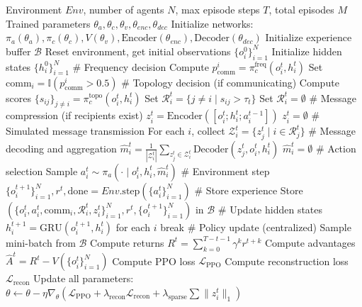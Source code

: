 \documentclass[10pt, twocolumn]{IEEEtran}
\begin{document}
\begin{algorithm}[h]
\caption{Training Algorithm for AdaptiveComm Framework}
\begin{algorithmic}[1]
\REQUIRE Environment $Env$, number of agents $N$, max episode steps $T$, total episodes $M$
\ENSURE Trained parameters $\theta_a, \theta_c, \theta_v, \theta_{enc}, \theta_{dec}$
\STATE Initialize networks: $\pi_a(\theta_a), \pi_c(\theta_c), V(\theta_v), \text{Encoder}(\theta_{enc}), \text{Decoder}(\theta_{dec})$
\STATE Initialize experience buffer $\mathcal{B}$
\STATE Reset environment, get initial observations $\{o_i^0\}_{i=1}^N$
\STATE Initialize hidden states $\{h_i^0\}_{i=1}^N$
\STATE \# Frequency decision
\STATE Compute $p_{\text{comm}}^i = \pi_c^{\text{freq}}(o_i^t, h_i^t)$
\STATE Set $\text{comm}_i = \mathbb{I}(p_{\text{comm}}^i > 0.5)$
\STATE \# Topology decision (if communicating)
\STATE Compute scores $\{s_{ij}\}_{j\neq i} = \pi_c^{\text{topo}}(o_i^t, h_i^t)$
\STATE Set $\mathcal{R}_i^t = \{j \neq i \mid s_{ij} > \tau_t\}$
\ELSE
\STATE Set $\mathcal{R}_i^t = \emptyset$
\ENDIF
\STATE \# Message compression (if recipients exist)
\STATE $z_i^t = \text{Encoder}([o_i^t; h_i^t; a_i^{t-1}])$
\ELSE
\STATE $z_i^t = \emptyset$
\ENDIF
\ENDFOR
\STATE \# Simulated message transmission
\STATE For each $i$, collect $\mathcal{Z}_i^t = \{z_j^t \mid i \in \mathcal{R}_j^t\}$
\STATE \# Message decoding and aggregation
\STATE $\hat{m}_i^t = \frac{1}{|\mathcal{Z}_i^t|} \sum_{z_j^t \in \mathcal{Z}_i^t} \text{Decoder}(z_j^t, o_i^t, h_i^t)$
\ELSE
\STATE $\hat{m}_i^t = \emptyset$
\ENDIF
\STATE \# Action selection
\STATE Sample $a_i^t \sim \pi_a(\cdot \mid o_i^t, h_i^t, \hat{m}_i^t)$
\ENDFOR
\STATE \# Environment step
\STATE $\{o_i^{t+1}\}_{i=1}^N, r^t, \text{done} = Env.\text{step}(\{a_i^t\}_{i=1}^N)$
\STATE \# Store experience
\STATE Store $(\{o_i^t, a_i^t, \text{comm}_i, \mathcal{R}_i^t, z_i^t\}_{i=1}^N, r^t, \{o_i^{t+1}\}_{i=1}^N)$ in $\mathcal{B}$
\STATE \# Update hidden states
\STATE $h_i^{t+1} = \text{GRU}(o_i^{t+1}, h_i^t)$ for each $i$
 \STATE break \ENDIF
\ENDFOR
\STATE \# Policy update (centralized)
\STATE Sample mini-batch from $\mathcal{B}$
\STATE Compute returns $R^t = \sum_{k=0}^{T-t-1} \gamma^k r^{t+k}$
\STATE Compute advantages $\hat{A}^t = R^t - V(\{o_i^t\}_{i=1}^N)$
\STATE Compute PPO loss $\mathcal{L}_{\text{PPO}}$
\STATE Compute reconstruction loss $\mathcal{L}_{\text{recon}}$
\STATE Update all parameters: $\theta \leftarrow \theta - \eta \nabla_\theta (\mathcal{L}_{\text{PPO}} + \lambda_{\text{recon}}\mathcal{L}_{\text{recon}} + \lambda_{\text{sparse}}\sum \|z_i^t\|_1)$
\ENDFOR
\end{algorithmic}
\end{algorithm}
\end{document}
